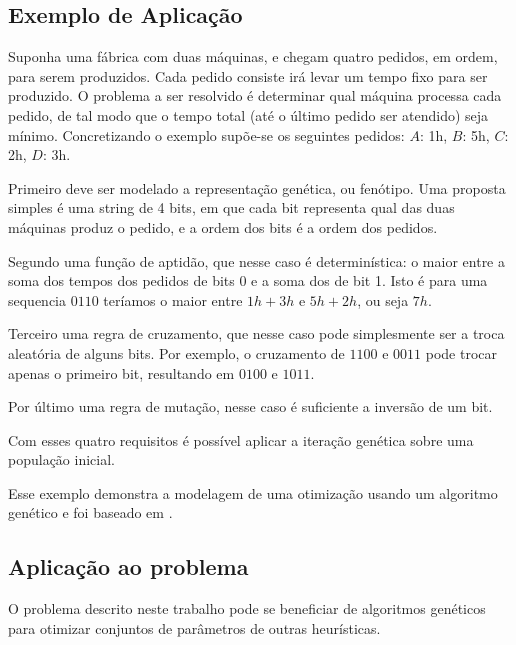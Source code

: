 \subsection{Exemplo de Aplicação}

Suponha uma fábrica com duas máquinas, e chegam quatro pedidos, em ordem, para serem produzidos.
Cada pedido consiste irá levar um tempo fixo para ser produzido.
O problema a ser resolvido é determinar qual máquina processa cada pedido, de tal modo que
o tempo total (até o último pedido ser atendido) seja mínimo.
Concretizando o exemplo supõe-se os seguintes pedidos: $A$: 1h, $B$: 5h, $C$: 2h, $D$: 3h.

Primeiro deve ser modelado a representação genética, ou fenótipo.
Uma proposta simples é uma string de 4 bits, em que cada bit representa qual das duas máquinas produz
o pedido, e a ordem dos bits é a ordem dos pedidos.

Segundo uma função de aptidão, que nesse caso é determinística: o maior entre a soma dos tempos dos pedidos
de bits 0 e a soma dos de bit 1. Isto é para uma sequencia $0110$ teríamos o maior entre $1h + 3h$ e $5h + 2h$,
ou seja $7h$.

Terceiro uma regra de cruzamento, que nesse caso pode simplesmente ser a troca aleatória de alguns bits.
Por exemplo, o cruzamento de $1100$ e $0011$ pode trocar apenas o primeiro bit, resultando em $0100$ e $1011$.

Por último uma regra de mutação, nesse caso é suficiente a inversão de um bit.

Com esses quatro requisitos é possível aplicar a iteração genética sobre uma população inicial.

Esse exemplo demonstra a modelagem de uma otimização usando um algoritmo genético e foi baseado em \cite{vieira2002algogeneticos}.

\subsection{Aplicação ao problema}

O problema descrito neste trabalho pode se beneficiar de algoritmos genéticos para otimizar conjuntos de
parâmetros de outras heurísticas.
